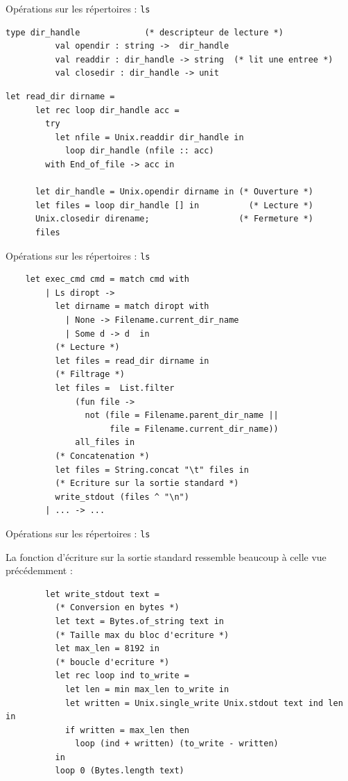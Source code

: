 \begin{frame}[fragile]{Opérations sur les répertoires : \texttt{ls}}
    \begin{lstlisting}[basicstyle=\scriptsize\ttfamily]
          type dir_handle             (* descripteur de lecture *)
          val opendir : string ->  dir_handle
          val readdir : dir_handle -> string  (* lit une entree *)
          val closedir : dir_handle -> unit
    \end{lstlisting}
    
    \begin{lstlisting}[basicstyle=\scriptsize\ttfamily]
    let read_dir dirname =
      let rec loop dir_handle acc =
        try  
          let nfile = Unix.readdir dir_handle in
            loop dir_handle (nfile :: acc)
        with End_of_file -> acc in
        
      let dir_handle = Unix.opendir dirname in (* Ouverture *)
      let files = loop dir_handle [] in          (* Lecture *)
      Unix.closedir direname;                  (* Fermeture *)
      files
    \end{lstlisting}
\end{frame}

\begin{frame}[fragile]{Opérations sur les répertoires : \texttt{ls}}
        \begin{lstlisting}
    let exec_cmd cmd = match cmd with
        | Ls diropt ->
          let dirname = match diropt with 
            | None -> Filename.current_dir_name 
            | Some d -> d  in
          (* Lecture *)
          let files = read_dir dirname in
          (* Filtrage *)
          let files =  List.filter
              (fun file ->
                not (file = Filename.parent_dir_name || 
                     file = Filename.current_dir_name))
              all_files in
          (* Concatenation *)
          let files = String.concat "\t" files in
          (* Ecriture sur la sortie standard *)
          write_stdout (files ^ "\n")
        | ... -> ...
        \end{lstlisting}
\end{frame}

\begin{frame}[fragile]{Opérations sur les répertoires : \texttt{ls}}

    La fonction d'écriture sur la sortie standard ressemble beaucoup à celle vue précédemment :
    \begin{lstlisting}
        let write_stdout text =
          (* Conversion en bytes *)
          let text = Bytes.of_string text in
          (* Taille max du bloc d'ecriture *)
          let max_len = 8192 in
          (* boucle d'ecriture *)
          let rec loop ind to_write =
            let len = min max_len to_write in
            let written = Unix.single_write Unix.stdout text ind len in
            if written = max_len then
              loop (ind + written) (to_write - written)
          in
          loop 0 (Bytes.length text)
    \end{lstlisting}
\end{frame}

